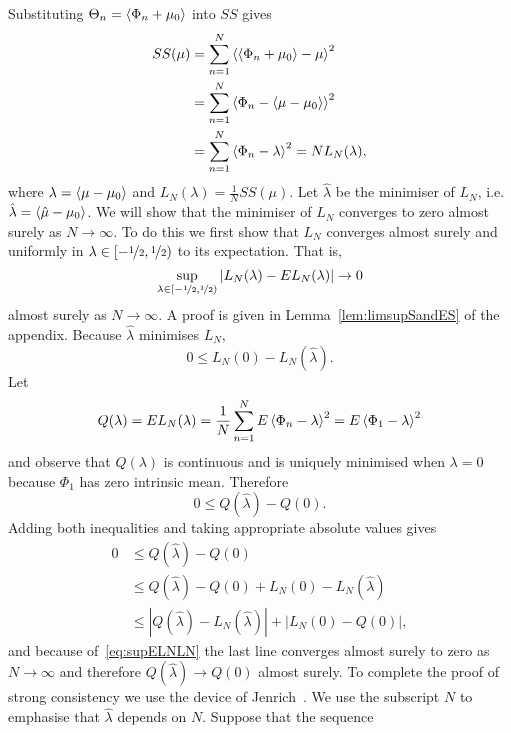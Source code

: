 \documentclass[journal]{IEEEtran}
\begin{document}
\begin{IEEEproof}
Substituting $\Theta_n = \left< \Phi_n + \mu_0 \right>$ into $SS$ gives
\begin{align*}
SS(\mu) &= \sum_{n=1}^{N}{ \left< \left< \Phi_n + \mu_0 \right> - \mu \right>^2 } \\
&= \sum_{n=1}^{N}{ \left< \Phi_n - \left< \mu - \mu_0 \right> \right>^2 } \\
&= \sum_{n=1}^{N}{ \left< \Phi_n - \lambda \right>^2 } = NL_N(\lambda),
\end{align*}
where $\lambda = \left< \mu - \mu_0 \right>$ and $L_N(\lambda) = \tfrac{1}{N}SS(\mu)$. Let $\hat{\lambda}$ be the minimiser of $L_N$, i.e. $\hat{\lambda} = \left< \hat{\mu} - \mu_0 \right>$. We will show that the minimiser of $L_N$ converges to zero almost surely as $N \rightarrow \infty$. To do this we first show that $L_N$ converges almost surely and uniformly in $\lambda \in [-\nicefrac{1}{2}, \nicefrac{1}{2})$ to its expectation. That is,
\begin{equation}\label{eq:supELNLN}
\sup_{\lambda \in [-\nicefrac{1}{2}, \nicefrac{1}{2})}| L_N(\lambda) - EL_N(\lambda) | \rightarrow 0
\end{equation}
almost surely as $N \rightarrow \infty$. A proof is given in Lemma~\ref{lem:limsupSandES} of the appendix. %
Because $\hat{\lambda}$ minimises $L_N$,
\[
0 \leq L_N(0) - L_N(\hat{\lambda}).
\] 
Let
\[
Q(\lambda) = EL_N(\lambda) = \frac{1}{N}\sum_{n=1}^{N}E\left< \Phi_n - \lambda \right>^2 = E\left< \Phi_1 - \lambda \right>^2
\] 
and observe that $Q(\lambda)$ is continuous and is uniquely minimised when $\lambda = 0$ because $\Phi_1$ has zero intrinsic mean. Therefore
\[
0 \leq Q(\hat{\lambda}) - Q(0).
\]
Adding both inequalities and taking appropriate absolute values gives
\begin{align*}
0 &\leq Q(\hat{\lambda}) - Q(0) \\ 
& \leq Q(\hat{\lambda}) - Q(0) + L_N(0) - L_N(\hat{\lambda})\\
& \leq |Q(\hat{\lambda}) - L_N(\hat{\lambda})| + |L_N(0) - Q(0)|,
\end{align*}
and because of~\eqref{eq:supELNLN} the last line converges almost surely to zero as $N \rightarrow \infty$ and therefore $Q(\hat{\lambda}) \rightarrow Q(0)$ almost surely. To complete the proof of strong consistency we use the device of Jenrich~\cite{Jenrich_asymp_nonlin_ulln_1969}. We use the
subscript $N$ to emphasise that $\hat{\lambda}$ depends on $N.$ Suppose that the sequence

\end{IEEEproof}
\end{document}
